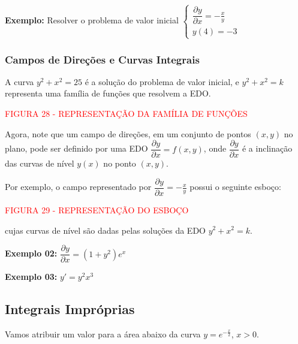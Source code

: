 \documentclass[oneside,a4paper,12pt]{article}
\begin{document}
{\bf Exemplo:} Resolver o problema de valor inicial
$\begin{cases}
\dfrac{\partial y}{\partial x} = - \frac{x}{y} \\
y(4) = -3
\end{cases}
$

\vspace{300pt}

\subsubsection{Campos de Direções e Curvas Integrais}
A curva $y^2 + x^2 = 25$ é a solução do problema de valor inicial, e $y^2 + x^2 = k$ representa uma família de funções que resolvem a EDO.

\vspace{220pt}
\begin{center}
	\textcolor{red}{FIGURA 28 - REPRESENTAÇÃO DA FAMÍLIA DE FUNÇÕES}
\end{center}

Agora, note que um campo de direções, em um conjunto de pontos $(x,y)$ no plano, pode ser definido por uma EDO $\dfrac{\partial y}{\partial x} = f(x,y)$, onde $\dfrac{\partial y}{\partial x}$ é a inclinação das curvas de nível $y(x)$ no ponto $(x,y)$.

Por exemplo, o campo representado por $\dfrac{\partial y}{\partial x} = - \frac{x}{y}$ possui o seguinte esboço:

\vspace{220pt}
\begin{center}
	\textcolor{red}{FIGURA 29 - REPRESENTAÇÃO DO ESBOÇO}
\end{center}

cujas curvas de nível são dadas pelas soluções da EDO $y^2 + x^2 = k$.


{\bf Exemplo 02:} $\dfrac{\partial y}{\partial x} = (1 + y^2)e^x$

\vspace{200pt}

{\bf Exemplo 03:} $y' = y^2x^3$

\vspace{300pt}

\subsection{Integrais Impróprias}

Vamos atribuir um valor para a área abaixo da curva $y = e^{-\frac{x}{2}}$, $x>0$.
\end{document}
